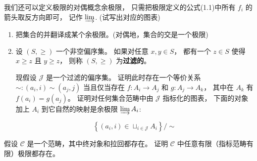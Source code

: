 \begin{exercise}[极限和余极限]
    我们还可以定义极限的对偶概念余极限，
    只需把极限定义的公式(1.1)中所有 $f_{i}$ 的箭头取反方向即可，
    记作 $\varinjlim$. (试写出对应的图表)
    \begin{enumerate}
        \item 把集合的并翻译成某个余极限。(对偶地，集合的交是一个极限)
        \item 设 $(S, \geq)$ 一个非空偏序集。
        如果对任意 $x, y \in S$，
        都有一个 $z \in S$ 使得 $x \geq z$ 且 $y \geq z$，
        则称 $(S, \geq)$ 为\textbf{过滤的}。

        现假设 $\mathcal{J}$ 是一个过滤的偏序集。
        证明此时存在一个等价关系 $\sim:(a_{i}, i) \sim(a_{j}, j)$
        当且仅当存在 $f: A_{i} \rightarrow A_{j}$ 和 $g: A_{j} \rightarrow A_{k}$，
        其中在 $A_{k}$ 有 $f(a_{i})=g(a_{j})$。
        证明对任何集合范畴中由 $\mathcal{J}$ 指标化的图表，
        下面的对象加上 $A_{i}$ 到它自然的映射是余极限 $\varinjlim A_{i}$:

        $$
        \left\{\left(a_{i}, i\right) \in \sqcup_{i \in \mathcal{J}} A_{i}\right\} / \sim
        $$
    \end{enumerate}
\end{exercise}

\begin{exercise}[极限的存在性]
    假设 $\mathcal{C}$ 是一个范畴，其中终对象和拉回都存在。
    证明 $\mathcal{C}$ 中任意有限（指标范畴有限）极限都存在。
\end{exercise}

